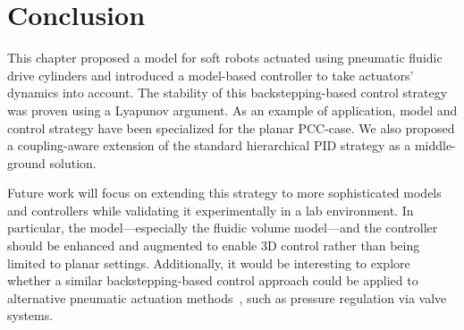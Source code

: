 \section{Conclusion}\label{sec:backstepping:conclusion}
%
This chapter proposed a model for soft robots actuated using pneumatic fluidic drive cylinders and introduced a model-based controller to take actuators' dynamics into account. The stability of this backstepping-based control strategy was proven using a Lyapunov argument.  As an example of application, model and control strategy have been specialized for the planar \gls{PCC}-case. We also proposed a coupling-aware extension of the standard hierarchical PID strategy as a middle-ground solution.

Future work will focus on extending this strategy to more sophisticated models and controllers while validating it experimentally in a lab environment. In particular, the model—especially the fluidic volume model—and the controller should be enhanced and augmented to enable 3D control rather than being limited to planar settings. Additionally, it would be interesting to explore whether a similar backstepping-based control approach could be applied to alternative pneumatic actuation methods~\citep{franco2024model}, such as pressure regulation via valve systems.